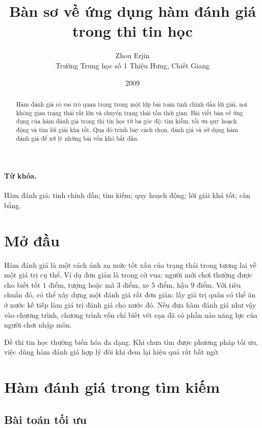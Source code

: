 \documentclass[11pt]{article}
\title{Bàn sơ về ứng dụng hàm đánh giá trong thi tin học}
\author{Zhou Erjin\\Trường Trung học số 1 Thiệu Hưng, Chiết Giang}
\date{2009}
\begin{document}
\maketitle


\begin{abstract}
Hàm đánh giá có vai trò quan trọng trong một lớp bài toán tinh chỉnh dần lời
giải, nơi không gian trạng thái rất lớn và chuyển trạng thái tốn thời gian.
Bài viết bàn về ứng dụng của hàm đánh giá trong thi tin học từ ba góc độ:
tìm kiếm, tối ưu quy hoạch động và tìm lời giải khá tốt. Qua đó trình bày
cách chọn, đánh giá và sử dụng hàm đánh giá để xử lý những bài vốn khó bắt
đầu.
\end{abstract}

\paragraph{Từ khóa.}
Hàm đánh giá; tinh chỉnh dần; tìm kiếm; quy hoạch động; lời giải khá tốt; cân
bằng.

\tableofcontents

\section{Mở đầu}

Hàm đánh giá là một cách ánh xạ mức tốt xấu của trạng thái trong tương lai về
một giá trị cụ thể. Ví dụ đơn giản là trong cờ vua: người mới chơi thường được
cho biết tốt \(1\) điểm, tượng hoặc mã \(3\) điểm, xe \(5\) điểm, hậu \(9\)
điểm. Với tiêu chuẩn đó, có thể xây dựng một đánh giá rất đơn giản: lấy giá
trị quân có thể ăn ở nước kế tiếp làm giá trị đánh giá cho nước đó. Nếu đưa
hàm đánh giá như vậy vào chương trình, chương trình vốn chỉ biết vét cạn đã
có phần nào năng lực của người chơi nhập môn.

Đề thi tin học thường biến hóa đa dạng. Khi chưa tìm được phương pháp tối ưu,
việc dùng hàm đánh giá hợp lý đôi khi đem lại hiệu quả rất bất ngờ.

\section{Hàm đánh giá trong tìm kiếm}

\subsection{Bài toán tối ưu}
\end{document}
